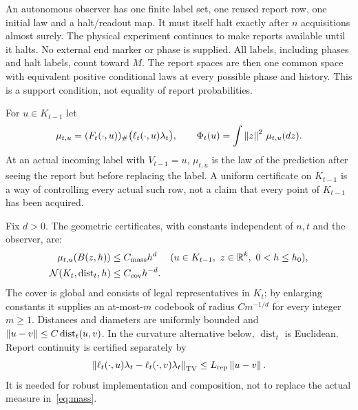 An autonomous observer has one finite label set, one reused report row, one initial law and a halt/readout map. It must itself halt exactly after $n$ acquisitions almost surely. The physical experiment continues to make reports available until it halts. No external end marker or phase is supplied. All labels, including phases and halt labels, count toward $M$. The report spaces are then one common space with equivalent positive conditional laws at every possible phase and history. This is a support condition, not equality of report probabilities.

For $u\in K_{t-1}$ let
\begin{equation}\label{eq:row-law}
 \mu_{t,u}=(F_t(\cdot,u))_\#\bigl(\ell_t(\cdot,u)\lambda_t\bigr),
 \qquad \Phi_t(u)=\int\left\lVert z\right\rVert^2\,\mu_{t,u}(dz).
\end{equation}
At an actual incoming label with $V_{t-1}=u$, $\mu_{t,u}$ is the law of the prediction after seeing the report but before replacing the label. A uniform certificate on $K_{t-1}$ is a way of controlling every actual such row, not a claim that every point of $K_{t-1}$ has been acquired.

Fix $d>0$. The geometric certificates, with constants independent of $n,t$ and the observer, are:
\begin{align}
 \mu_{t,u}(B(z,h))&\le C_{\rm mass}h^d
 &&(u\in K_{t-1},\ z\in\mathbb R^k,\ 0<h\le h_0),\label{eq:mass}\\
 \mathcal N(K_t,\operatorname{dist}_t,h)&\le C_{\rm cov}h^{-d}.
 \label{eq:cover}
\end{align}
The cover is global and consists of legal representatives in $K_t$; by enlarging constants it supplies an at-most-$m$ codebook of radius $C m^{-1/d}$ for every integer $m\ge1$. Distances and diameters are uniformly bounded and $\left\lVert u-v\right\rVert\le C\operatorname{dist}_t(u,v)$. In the curvature alternative below, $\operatorname{dist}_t$ is Euclidean. Report continuity is certified separately by
\begin{equation}\label{eq:report-continuity}
 \left\lVert\ell_t(\cdot,u)\lambda_t-\ell_t(\cdot,v)\lambda_t\right\rVert_{\operatorname{TV}}
 \le L_{\rm rep}\left\lVert u-v\right\rVert.
\end{equation}
It is needed for robust implementation and composition, not to replace the actual measure in~\eqref{eq:mass}.

